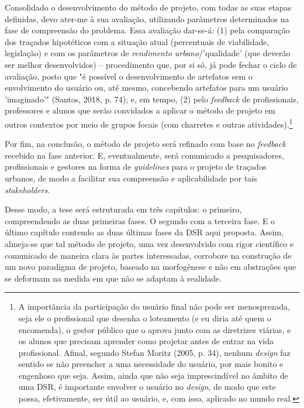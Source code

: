 \documentclass[]{report}
\begin{document}
    Consolidado o desenvolvimento do método de projeto, com todas as suas etapas definidas, devo ater-me à sua avaliação, utilizando parâmetros determinados na fase de compreensão do problema. Essa avaliação dar-se-á: (1) pela comparação dos traçados hipotéticos com a situação atual (percentuais de viabilidade, legislação) e com os parâmetros de \textit{rendimento urbano}/'qualidade' (que deverão ser melhor desenvolvidos) – procedimento que, por si só, já pode fechar o ciclo de avaliação, posto que "é possível o desenvolvimento de artefatos sem o envolvimento do usuário ou, até mesmo, concebendo artefatos para um usuário 'imaginado'" (Santos, 2018, p. 74); e, em tempo, (2) pelo \textit{feedback} de profissionais, professores e alunos que serão convidados a aplicar o método de projeto em outros contextos por meio de grupos focais (com charretes e outras atividades).\footnote[2]{A importância da participação do usuário final não pode ser menosprezada, seja ele o profissional que desenha o loteamento (e eu diria até quem o encomenda), o gestor público que o aprova junto com as diretrizes viárias, e os alunos que precisam aprender como projetar antes de entrar na vida profissional. Afinal, segundo Stefan Moritz (2005, p. 34), nenhum \textit{design} faz sentido se não preencher a uma necessidade do usuário, por mais bonito e engenhoso que seja. Assim, ainda que não seja imprescindível no âmbito de uma DSR, é importante envolver o usuário no \textit{design}, de modo que este possa, efetivamente, ser útil ao usuário, e, com isso, aplicado no mundo real.} 

    Por fim, na conclusão, o método de projeto será refinado com base no \textit{feedback} recebido na fase anterior. E, eventualmente, será comunicado a pesquisadores, profissionais e gestores na forma de \textit{guidelines} para o projeto de traçados urbanos, de modo a facilitar sua compreensão e aplicabilidade por tais \textit{stakeholders}. 
    
    Desse modo, a tese será estruturada em três capítulos: o primeiro, compreendendo as duas primeiras fases. O segundo com a terceira fase. E o último capítulo contendo as duas últimas fases da DSR aqui proposta. Assim, almeja-se que tal método de projeto, uma vez desenvolvido com rigor científico e comunicado de maneira clara às partes interessadas, corrobore na construção de um novo paradigma de projeto, baseado na morfogênese e não em abstrações que se deformam na medida em que não se adaptam à realidade.
\end{document}
